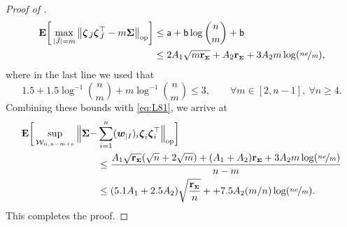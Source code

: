 \documentclass[aos,preprint,reqno]{imsart}
\newcommand\bzeta{\boldsymbol\zeta}
\newcommand\bSigma{\boldsymbol\Sigma}
\newcommand\bfE{\mathbf E}
\newcommand\bw{\boldsymbol w}
\newcommand\rSigma{\textbf{\textup{r}}_{\scriptscriptstyle\bSigma}}
\theoremstyle{plain}
\theoremstyle{remark}
\begin{document}
\begin{proof}[Proof of ]
	\begin{align}
		\bfE\bigg[\max_{|\bar J| = m} \big\|\bzeta_{\bar J}\bzeta_{\bar J}^\top - 
		m\bSigma\big\|_{\textup{op}} \bigg] 
		&\le \mathsf a +  \mathsf b \log {n\choose m} + \mathsf b\\
		&\le 2A_1\sqrt{m\rSigma} + A_2\rSigma + 3A_2 m \log(\nicefrac{ne}{m}),
	\end{align}
	where in the last line we used that 
	$$
	1.5 + 1.5\log^{-1}{n\choose m} + m\log^{-1}{n\choose m}
	\le 3,\qquad \forall m\in[2,n-1],\ 
	\forall n\ge 4.
	$$
	Combining these bounds with \eqref{eq:L81}, we arrive at
	\begin{align}
			\bfE\bigg[\sup_{\mathcal W_{n,n-m+o}}\limits \Big\|\bSigma -& 
			\sum_{i=1}^n (\bw_{|I})_i\bzeta_i\bzeta_i^\top\Big\|_{\textup{op}}\bigg]\\
			&\le  \frac{A_1\sqrt{\rSigma}(\sqrt{n} + 2\sqrt{m}) + (A_1+A_2)\rSigma 
			+ 3A_2 m \log(\nicefrac{ne}{m})}{n-m}\\
			&\le (5.1A_1 + 2.5 A_2)\sqrt{\frac{\rSigma}{n}} +
			+ 7.5A_2 (m/n) \log(\nicefrac{ne}{m}).\label{eq:L85}
	\end{align}
	This completes the proof.
	\end{proof}
	

\end{document}

